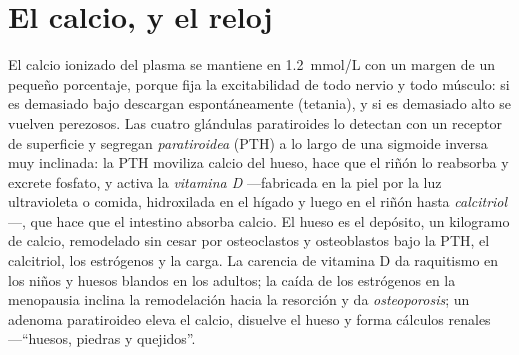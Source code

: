 \section{El calcio, y el reloj}

\begin{definition}\label{def:b3:endocrinology:calcium}
El calcio ionizado del plasma se mantiene en \qty{1.2}{mmol/L} con un
margen de un pequeño porcentaje, porque fija la excitabilidad de todo
nervio y todo músculo: si es demasiado bajo descargan espontáneamente
(tetania), y si es demasiado alto se vuelven perezosos. Las cuatro
glándulas paratiroides lo detectan con un receptor de superficie y
segregan \emph{ paratiroidea} (PTH) a lo largo de una sigmoide
inversa muy inclinada: la PTH moviliza calcio del hueso, hace que el
riñón lo reabsorba y excrete fosfato, y activa la \emph{vitamina D}
---fabricada en la piel por la luz ultravioleta o comida, hidroxilada
en el hígado y luego en el riñón hasta \emph{calcitriol}---, que hace
que el intestino absorba calcio. El hueso es el depósito, un kilogramo
de calcio, remodelado sin cesar por osteoclastos y osteoblastos bajo la
PTH, el calcitriol, los estrógenos y la carga. La carencia de vitamina
D da raquitismo en los niños y huesos blandos en los adultos; la caída
de los estrógenos en la menopausia inclina la remodelación hacia la
resorción y da \emph{osteoporosis}; un adenoma paratiroideo eleva el
calcio, disuelve el hueso y forma cálculos renales ---``huesos, piedras
y quejidos''.
\end{definition}


